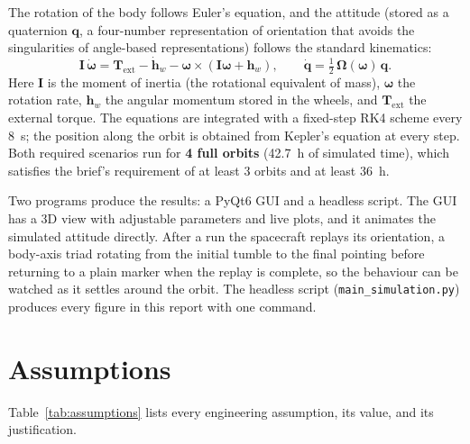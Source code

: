 \documentclass[11pt,a4paper]{article}
\begin{document}
The rotation of the body follows Euler's equation, and the attitude
(stored as a quaternion \(\mathbf q\), a four-number representation of
orientation that avoids the singularities of angle-based
representations) follows the standard kinematics:
\begin{equation}
\mathbf{I}\,\dot{\boldsymbol\omega}
  = \mathbf{T}_{\mathrm{ext}} - \dot{\mathbf h}_w
  - \boldsymbol\omega \times \left(\mathbf{I}\boldsymbol\omega + \mathbf h_w\right),
\qquad
\dot{\mathbf q} = \tfrac{1}{2}\,\boldsymbol\Omega(\boldsymbol\omega)\,\mathbf q .
\label{eq:euler}
\end{equation}
Here \(\mathbf I\) is the moment of inertia (the rotational equivalent of
mass), \(\boldsymbol\omega\) the rotation rate, \(\mathbf h_w\) the
angular momentum stored in the wheels, and \(\mathbf T_{\mathrm{ext}}\)
the external torque. The equations are integrated with a fixed-step RK4
scheme every \SI{8}{s}; the position along the orbit is obtained from
Kepler's equation at every step. Both required scenarios run for
\textbf{4 full orbits} (\SI{42.7}{h} of simulated time), which satisfies
the brief's requirement of at least 3 orbits and at least \SI{36}{h}.

Two programs produce the results: a PyQt6 GUI and a headless script. The
GUI has a 3D view with adjustable parameters and live plots, and it
animates the simulated attitude directly. After a run the spacecraft
replays its orientation, a body-axis triad rotating from the initial
tumble to the final pointing before returning to a plain marker when the
replay is complete, so the behaviour can be watched as it settles around
the orbit. The headless script (\texttt{main\_simulation.py}) produces
every figure in this report with one command.

\section{Assumptions}

Table~\ref{tab:assumptions} lists every engineering assumption, its
value, and its justification.
\end{document}
